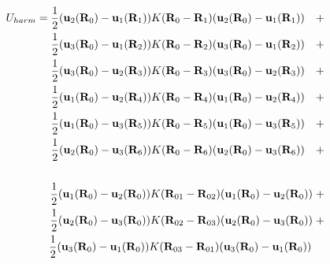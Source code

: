 \documentclass[a5paper,12pt]{article}
\begin{document}
\newpage


\begin{equation}
 \begin{aligned}
U_{harm} = \newline
\frac{1}{2}(\mathbf{u}_2(\mathbf{R}_0) - \mathbf{u}_1(\mathbf{R}_1))
K(\mathbf{R}_0-\mathbf{R}_1)
(\mathbf{u}_2(\mathbf{R}_0) - \mathbf{u}_1(\mathbf{R}_1))\quad + \\
\frac{1}{2}(\mathbf{u}_3(\mathbf{R}_0) - \mathbf{u}_1(\mathbf{R}_2))
K(\mathbf{R}_0-\mathbf{R}_2)
(\mathbf{u}_3(\mathbf{R}_0) - \mathbf{u}_1(\mathbf{R}_2))\quad + \\
\frac{1}{2}(\mathbf{u}_3(\mathbf{R}_0) - \mathbf{u}_2(\mathbf{R}_3))
K(\mathbf{R}_0-\mathbf{R}_3)
(\mathbf{u}_3(\mathbf{R}_0) - \mathbf{u}_2(\mathbf{R}_3))\quad + \\
\frac{1}{2}(\mathbf{u}_1(\mathbf{R}_0) - \mathbf{u}_2(\mathbf{R}_4))
K(\mathbf{R}_0-\mathbf{R}_4)
(\mathbf{u}_1(\mathbf{R}_0) - \mathbf{u}_2(\mathbf{R}_4))\quad + \\
\frac{1}{2}(\mathbf{u}_1(\mathbf{R}_0) - \mathbf{u}_3(\mathbf{R}_5))
K(\mathbf{R}_0-\mathbf{R}_5)
(\mathbf{u}_1(\mathbf{R}_0) - \mathbf{u}_3(\mathbf{R}_5))\quad + \\
\frac{1}{2}(\mathbf{u}_2(\mathbf{R}_0) - \mathbf{u}_3(\mathbf{R}_6))
K(\mathbf{R}_0-\mathbf{R}_6)
(\mathbf{u}_2(\mathbf{R}_0) - \mathbf{u}_3(\mathbf{R}_6))\quad + \\
\\
\frac{1}{2}(\mathbf{u}_1(\mathbf{R}_0) - \mathbf{u}_2(\mathbf{R}_0))
K(\mathbf{R}_{01}-\mathbf{R}_{02})
(\mathbf{u}_1(\mathbf{R}_0) - \mathbf{u}_2(\mathbf{R}_0))\; + \\
\frac{1}{2}(\mathbf{u}_2(\mathbf{R}_0) - \mathbf{u}_3(\mathbf{R}_0))
K(\mathbf{R}_{02}-\mathbf{R}_{03})
(\mathbf{u}_2(\mathbf{R}_0) - \mathbf{u}_3(\mathbf{R}_0))\; + \\
\frac{1}{2}(\mathbf{u}_3(\mathbf{R}_0) - \mathbf{u}_1(\mathbf{R}_0))
K(\mathbf{R}_{03}-\mathbf{R}_{01})
(\mathbf{u}_3(\mathbf{R}_0) - \mathbf{u}_1(\mathbf{R}_0))\;\;\;\ \\
\end{aligned} \nonumber
\end{equation}
\end{document}
